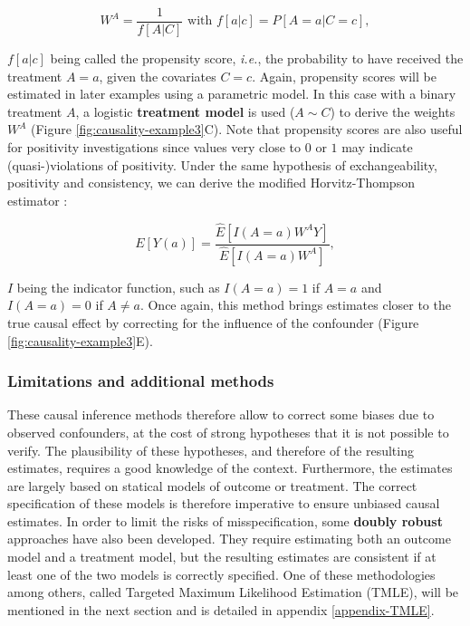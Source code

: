 \documentclass[a4paper,12pt,twoside,onecolumn,openright,final,oldfontcommands]{memoir}
\begin{document}
\[W^A=\dfrac{1}{f[A|C]} \text{ with } f[a|c]=P[A=a|C=c],\]

\(f[a|c]\) being called the propensity score, \emph{i.e.}, the
probability to have received the treatment \(A=a\), given the covariates
\(C=c\). Again, propensity scores will be estimated in later examples
using a parametric model. In this case with a binary treatment \(A\), a
logistic \textbf{treatment model} is used (\(A\sim C\)) to derive the
weights \(W^A\) (Figure \ref{fig:causality-example3}C). Note that
propensity scores are also useful for positivity investigations since
values very close to \(0\) or \(1\) may indicate (quasi-)violations of
positivity. Under the same hypothesis of exchangeability, positivity and
consistency, we can derive the modified Horvitz-Thompson estimator
\citep{horvitz1952generalization, hernan2020causal}:

\begin{equation}
E[Y(a)]=\dfrac{\hat{E}[I(A=a)W^{A}Y]}{\hat{E}[I(A=a)W^A]},
\label{eq:ipweq2}
\end{equation}

\(I\) being the indicator function, such as \(I(A=a)=1\) if \(A=a\) and
\(I(A=a)=0\) if \(A\neq a\). Once again, this method brings estimates
closer to the true causal effect by correcting for the influence of the
confounder (Figure \ref{fig:causality-example3}E).

\subsubsection{Limitations and additional
methods}\label{limitations-and-additional-methods}

These causal inference methods therefore allow to correct some biases
due to observed confounders, at the cost of strong hypotheses that it is
not possible to verify. The plausibility of these hypotheses, and
therefore of the resulting estimates, requires a good knowledge of the
context. Furthermore, the estimates are largely based on statical models
of outcome or treatment. The correct specification of these models is
therefore imperative to ensure unbiased causal estimates. In order to
limit the risks of misspecification, some \textbf{doubly robust}
approaches have also been developed. They require estimating both an
outcome model and a treatment model, but the resulting estimates are
consistent if at least one of the two models is correctly specified. One
of these methodologies among others, called Targeted Maximum Likelihood
Estimation (TMLE), will be mentioned in the next section and is detailed
in appendix \ref{appendix-TMLE}.
\end{document}
